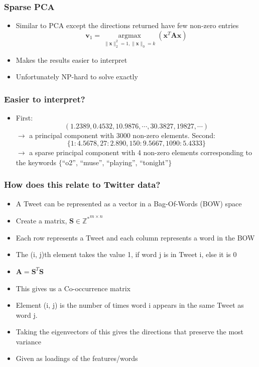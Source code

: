 \documentclass{beamer}
\begin{document}
\begin{frame}
\frametitle{Sparse PCA}
\begin{itemize}
\item Similar to PCA except the directions returned have few non-zero entries
\begin{equation}
\mathbf{v}_1 = \underset{\|\mathbf{x}\|_2^2 = 1, \|\mathbf{x}\|_0 = k}{\operatorname{argmax}}\left( \mathbf{x}^T\mathbf{A}\mathbf{x}\right)
\end{equation}
\item Makes the results easier to interpret
\item Unfortunately NP-hard to solve exactly
\end{itemize}
\end{frame}

\begin{frame}
\frametitle{Easier to interpret?}
\begin{itemize}
\item First:
\begin{equation}
\left(1.2389, 0.4532, 10.9876, \cdots, 30.3827, 19827, \cdots\right) 
\end{equation}
$\rightarrow$ a principal component with 3000 non-zero elements.
Second: 
\begin{equation}
\{1: 4.5678, 27: 2.890, 150: 9.5667, 1090: 5.4333\}
\end{equation}
$\rightarrow$ a sparse principal component with 4 non-zero elements corresponding to the keywords $\{$``o2'', ``muse'', ``playing'', ``tonight''$\}$
\end{itemize}
 
\end{frame}

\begin{frame}
\frametitle{How does this relate to Twitter data?}
\begin{itemize}
\item A Tweet can be represented as a vector in a Bag-Of-Words (BOW) space
\item Create a matrix, $\mathbf{S} \in \mathbb{Z^*}^{m \times n}$
\item Each row represents a Tweet and each column represents a word in the BOW
\item The (i, j)th element takes the value 1, if word j is in Tweet i, else it is 0
\item $\mathbf{A}=\mathbf{S}^T\mathbf{S}$
\item This gives us a Co-occurrence matrix
\item Element (i, j) is the number of times word i appears in the same Tweet as word j.
\item Taking the eigenvectors of this gives the directions that preserve the most variance
\item Given as loadings of the features/words

\end{itemize}
\end{frame}
\end{document}
